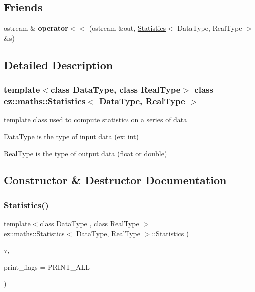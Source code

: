 \subsection*{Friends}
\begin{DoxyCompactItemize}
\item 
\mbox{\label{classez_1_1maths_1_1Statistics_a69cf0896adb2c328366d30bb7baf69fc}} 
ostream \& {\bfseries operator$<$$<$} (ostream \&out, \hyperlink{classez_1_1maths_1_1Statistics}{Statistics}$<$ Data\+Type, Real\+Type $>$ \&s)
\end{DoxyCompactItemize}


\subsection{Detailed Description}
\subsubsection*{template$<$class Data\+Type, class Real\+Type$>$\newline
class ez\+::maths\+::\+Statistics$<$ Data\+Type, Real\+Type $>$}

template class used to compute statistics on a series of data 


\begin{DoxyItemize}
\item Data\+Type is the type of input data (ex\+: int) 
\item Real\+Type is the type of output data (float or double) 
\end{DoxyItemize}

\subsection{Constructor \& Destructor Documentation}
\mbox{\label{classez_1_1maths_1_1Statistics_aa1a3aade13e58b388d48380cd0d44374}} 
\subsubsection{\texorpdfstring{Statistics()}{Statistics()}}
{\footnotesize\ttfamily template$<$class Data\+Type , class Real\+Type $>$ \\
\hyperlink{classez_1_1maths_1_1Statistics}{ez\+::maths\+::\+Statistics}$<$ Data\+Type, Real\+Type $>$\+::\hyperlink{classez_1_1maths_1_1Statistics}{Statistics} (\begin{DoxyParamCaption}\item[{vector$<$ \hyperlink{classez_1_1maths_1_1Value}{Value}$<$ Data\+Type $>$ $>$ \&}]{v,  }\item[{eze\+::natural}]{print\+\_\+flags = {\ttfamily PRINT\+\_\+ALL} }\end{DoxyParamCaption})\hspace{0.3cm}{\ttfamily [inline]}}

